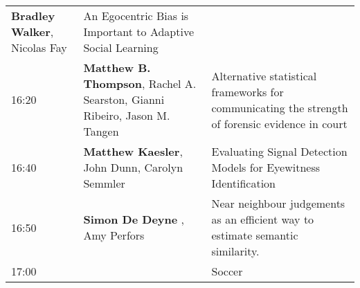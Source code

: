 \documentclass[]{article}
\begin{document}
\begin{longtable}[]{@{}lll@{}}
\begin{minipage}[t]{0.39\columnwidth}
\textbf{Bradley Walker}, Nicolas Fay\strut
\end{minipage} & \begin{minipage}[t]{0.50\columnwidth}\raggedright\strut
An Egocentric Bias is Important to Adaptive Social Learning\strut
\end{minipage}\tabularnewline
\begin{minipage}[t]{0.03\columnwidth}\raggedright\strut
16:20\strut
\end{minipage} & \begin{minipage}[t]{0.39\columnwidth}\raggedright\strut
\textbf{Matthew B. Thompson}, Rachel A. Searston, Gianni Ribeiro, Jason
M. Tangen\strut
\end{minipage} & \begin{minipage}[t]{0.50\columnwidth}\raggedright\strut
Alternative statistical frameworks for communicating the strength of
forensic evidence in court\strut
\end{minipage}\tabularnewline
\begin{minipage}[t]{0.03\columnwidth}\raggedright\strut
16:40\strut
\end{minipage} & \begin{minipage}[t]{0.39\columnwidth}\raggedright\strut
\textbf{Matthew Kaesler}, John Dunn, Carolyn Semmler\strut
\end{minipage} & \begin{minipage}[t]{0.50\columnwidth}\raggedright\strut
Evaluating Signal Detection Models for Eyewitness Identification\strut
\end{minipage}\tabularnewline
\begin{minipage}[t]{0.03\columnwidth}\raggedright\strut
16:50\strut
\end{minipage} & \begin{minipage}[t]{0.39\columnwidth}\raggedright\strut
\textbf{Simon De Deyne} , Amy Perfors\strut
\end{minipage} & \begin{minipage}[t]{0.50\columnwidth}\raggedright\strut
Near neighbour judgements as an efficient way to estimate semantic
similarity.\strut
\end{minipage}\tabularnewline
\begin{minipage}[t]{0.03\columnwidth}\raggedright\strut
17:00\strut
\end{minipage} & \begin{minipage}[t]{0.39\columnwidth}\raggedright\strut
\strut
\end{minipage} & \begin{minipage}[t]{0.50\columnwidth}\raggedright\strut
Soccer\strut
\end{minipage}\tabularnewline
\bottomrule
\end{longtable}
\end{document}

